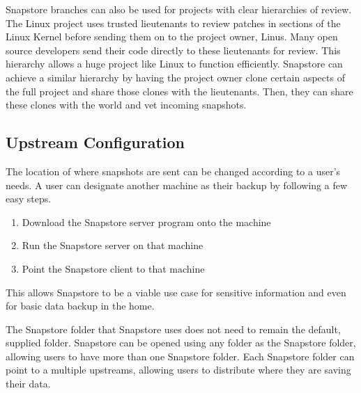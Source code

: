 Snapstore branches can also be used for projects with clear hierarchies of review. The Linux project uses trusted lieutenants to review patches in sections of the Linux Kernel before sending them on to the project owner, Linus. Many open source developers send their code directly to these lieutenants for review. This hierarchy allows a huge project like Linux to function efficiently. Snapstore can achieve a similar hierarchy by having the project owner clone certain aspects of the full project and share those clones with the lieutenants. Then, they can share these clones with the world and vet incoming snapshots.

\subsection{Upstream Configuration}

The location of where snapshots are sent can be changed according to a user's needs. A user can designate another machine as their backup by following a few easy steps. 
\begin{enumerate}
  \item{Download the Snapstore server program onto the machine}
  \item{Run the Snapstore server on that machine}
  \item{Point the Snapstore client to that machine}
\end{enumerate}

This allows Snapstore to be a viable use case for sensitive information and even for basic data backup in the home.

The Snapstore folder that Snapstore uses does not need to remain the default, supplied folder. Snapstore can be opened using any folder as the Snapstore folder, allowing users to have more than one Snapstore folder. Each Snapstore folder can point to a multiple upstreams, allowing users to distribute where they are saving their data.